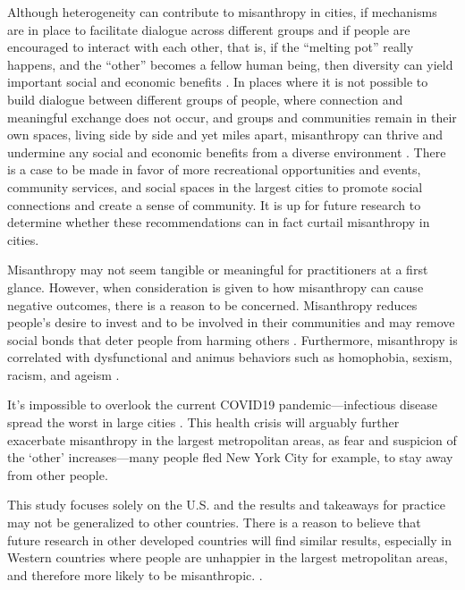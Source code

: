 \documentclass[11pt, letterpaper]{article}
\begin{document}
\begin{spacing}{1.4}
Although heterogeneity can contribute to misanthropy in cities, if mechanisms
are in place to facilitate dialogue across different groups and if people are
encouraged to interact with each other, that is, if the ``melting pot'' really
happens, and the ``other'' becomes a fellow human being, then diversity can
yield important social and economic benefits \citep{rodriguez2019does}.  In
places where it is not possible to build dialogue between different groups of
people, where connection and meaningful exchange does not occur, and groups and
communities remain in their own spaces, living side by side and yet miles apart,
misanthropy can thrive and undermine any social and economic benefits from a
diverse environment \citep{rodriguez2019does}. There is a case to be made in favor of more recreational opportunities and events, community services, and social spaces in the largest cities to promote social connections and create a sense of community. It is up for future research to determine whether these recommendations can  in fact curtail misanthropy in cities.

Misanthropy may not seem tangible or meaningful for practitioners at a first
glance. However, when consideration is given to how misanthropy can cause
negative outcomes, there is a  reason to be concerned. Misanthropy reduces people's desire to invest and to be involved in their communities and may remove social bonds that deter people from harming others
 \citep{weaver2006,hirschi1993,fafchamps2006,walters2013}. Furthermore, misanthropy is correlated with dysfunctional and animus behaviors such as
 homophobia, sexism, racism, and ageism \citep{cattacin2006}. 
 
It's impossible to overlook the current COVID19 pandemic---infectious disease
spread the worst in large cities \citep{bettencourt10}. This health crisis will arguably further exacerbate misanthropy in the largest metropolitan areas, as fear and suspicion of the `other' increases---many people fled New York City for example, to stay  away from other people. 



This study focuses solely on the U.S. and the results and takeaways for practice may
not be generalized to other countries. 
There is a reason to believe that future research in other developed countries will find similar results, especially in Western countries where people are unhappier in the largest metropolitan areas, and therefore more likely to be misanthropic. \citep{aokCityBook15}.


\end{spacing}
\end{document}

